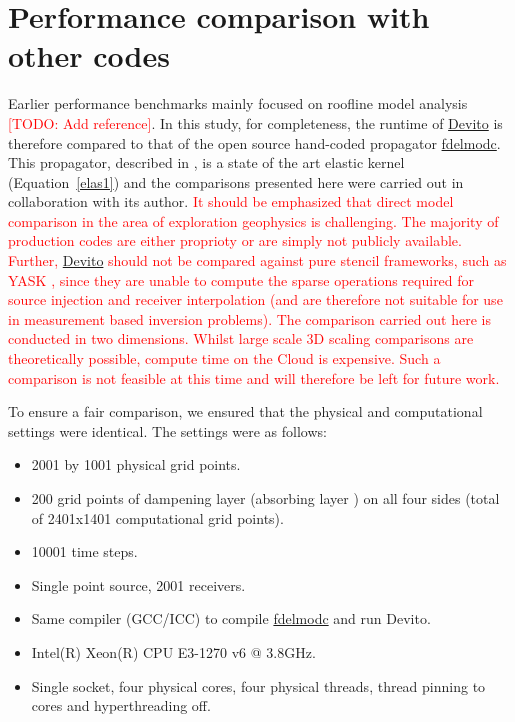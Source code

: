 \documentclass[10pt, conference]{IEEEtran}
\newcommand{\devito}{\href{https://github.com/devitocodes/devito}{Devito} }
\begin{document}
\section{Performance comparison with other
codes}\label{performance-comparison-with-other-codes}

Earlier performance benchmarks mainly focused on roofline model analysis
\textcolor{red}{[TODO: Add reference]}.
In this study, for completeness, the runtime of \devito is therefore
compared to that of the open source hand-coded propagator
\href{https://github.com/JanThorbecke/OpenSource.git}{fdelmodc}. This propagator,
described in \cite{thorbecke}, is a state of the art elastic kernel
(Equation~\ref{elas1}) and the comparisons presented here were carried out
in collaboration with its author.
\textcolor{red}{It should be emphasized that direct model comparison in
the area of exploration geophysics is challenging. The majority of production
codes are either proprioty or are simply not publicly available. Further,
\devito should not be compared against pure stencil frameworks,
such as YASK \cite{yask}, since they are unable to compute the sparse operations
required for source injection and receiver interpolation (and are therefore not
suitable for use in measurement based inversion problems). The comparison carried out
here is conducted in two dimensions. Whilst large scale 3D scaling comparisons are theoretically
possible, compute time on the Cloud is expensive. Such a comparison is not feasible at this
time and will therefore be left for future work.}

To ensure a fair comparison, we ensured that the
physical and computational settings were identical. The settings were as
follows:

\begin{itemize}
\itemsep1pt\parskip0pt
\item
  2001 by 1001 physical grid points.
\item
  200 grid points of dampening layer (absorbing layer \cite{cerjan}) on
  all four sides (total of 2401x1401 computational grid points).
\item
  10001 time steps.
\item
  Single point source, 2001 receivers.
\item
  Same compiler (GCC/ICC) to compile
  \href{https://github.com/JanThorbecke/OpenSource.git}{fdelmodc} and
  run Devito.
\item
  Intel(R) Xeon(R) CPU E3-1270 v6 @ 3.8GHz.
\item
  Single socket, four physical cores, four physical threads, thread
  pinning to cores and hyperthreading off.
\end{itemize}
\end{document}

